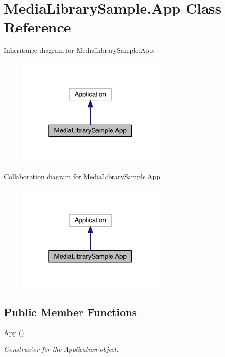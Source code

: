 \hypertarget{class_media_library_sample_1_1_app}{\section{Media\+Library\+Sample.\+App Class Reference}
\label{class_media_library_sample_1_1_app}
}


Inheritance diagram for Media\+Library\+Sample.\+App\+:
\nopagebreak
\begin{figure}[H]
\begin{center}
\leavevmode
\includegraphics[width=208pt]{class_media_library_sample_1_1_app__inherit__graph}
\end{center}
\end{figure}


Collaboration diagram for Media\+Library\+Sample.\+App\+:
\nopagebreak
\begin{figure}[H]
\begin{center}
\leavevmode
\includegraphics[width=208pt]{class_media_library_sample_1_1_app__coll__graph}
\end{center}
\end{figure}
\subsection*{Public Member Functions}
\begin{DoxyCompactItemize}
\item 
\hyperlink{class_media_library_sample_1_1_app_a5a43c324f5a7ca436bea1154b044fe7c}{App} ()
\begin{DoxyCompactList}\small\item\em Constructor for the Application object. \end{DoxyCompactList}\end{DoxyCompactItemize}
